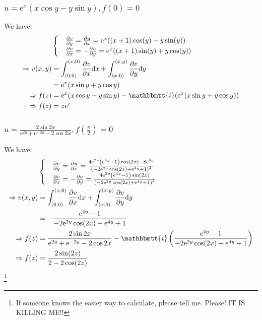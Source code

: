 \documentclass[]{ctexart}
\newcommand{\mi}{\mathbbmtt{i}}
\newcommand{\di}{\mathrm{d}}
\newcommand{\pa}{\partial}
\newcommand{\me}{\mathrm{e}}
\begin{document}
			\subsubsection{$u=\me ^x(x\cos y-y\sin y),f(0)=0$}
					We have:
						\begin{equation*}
						\begin{aligned}
							&\begin{cases}
								&\frac{\pa v}{\pa y}=\frac{\pa u}{\pa x}=\me^x ((x+1) \cos (y)-y \sin (y))\\
								&\frac{\pa v}{\pa x}=-\frac{\pa u}{\pa y}=\me^x ((x+1) \sin (y)+y \cos (y))
							\end{cases}\\
							\Rightarrow v(x,y)&=\int_{(0,0)}^{(x,0)}\frac{\pa v}{\pa x} \di x+\int_{(x,0)}^{(x,y)}\frac{\pa v}{\pa y} \di y\\
							&=\me ^x(x\sin y+y\cos y)\\
							\Rightarrow f(z)&=\me ^x(x\cos y-y\sin y)-\mi (\me ^x(x\sin y+y\cos y))\\
							\Rightarrow f(z)&=z\me^z
						\end{aligned}
						\end{equation*}
					
			\subsubsection{$u=\frac{2 \sin 2 x}{\me ^{2y}+\me ^{-2y}-2 \cos 2 x}, f\left(\frac{\pi}{2}\right)=0 $}
						We have:
							\begin{equation*}
							\begin{aligned}
								&\begin{cases}
									&\frac{\pa v}{\pa y}=\frac{\pa u}{\pa x}=\frac{4 \me^{2 y} \left(\me^{4 y}+1\right) \cos (2 x)-8 \me^{4 y}}{\left(-2 \me^{2 y} \cos (2 x)+\me^{4 y}+1\right)^2}\\
									&\frac{\pa v}{\pa x}=-\frac{\pa u}{\pa y}=\frac{4 \me^{2 y} \left(\me^{4 y}-1\right) \sin (2 x)}{\left(-2 \me^{2 y} \cos (2 x)+\me^{4 y}+1\right)^2}
								\end{cases}\\
								\Rightarrow v(x,y)&=\int_{(0,0)}^{(x,0)}\frac{\pa v}{\pa x} \di x+\int_{(x,0)}^{(x,y)}\frac{\pa v}{\pa y} \di y\\
								&=-\frac{\me^{4 y}-1}{-2 \me^{2 y} \cos (2 x)+\me^{4 y}+1}\\
								\Rightarrow f(z)&=\frac{2 \sin 2 x}{\me ^{2y}+\me ^{-2y}-2 \cos 2 x}-\mi \left(\frac{\me^{4 y}-1}{-2 \me^{2 y} \cos (2 x)+\me^{4 y}+1}\right)\\
								\Rightarrow f(z)&=\frac{2 \sin (2 z)}{2-2 \cos (2 z)}
							\end{aligned}
							\end{equation*}
					\footnote{If someone knows the easier way to calculate, please tell me. Please! IT IS KILLING ME!!}
							
\end{document}
